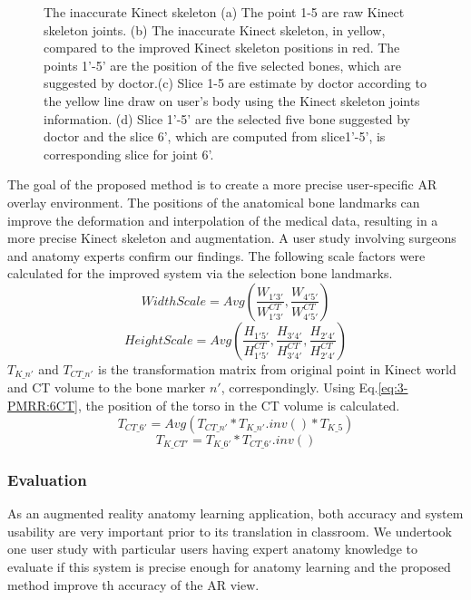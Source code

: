 \begin{figure}
{	}
	\label{fig:3-PRMM:5Joints}
	\caption{The inaccurate Kinect skeleton (a) The point 1-5 are raw Kinect skeleton joints. (b) The inaccurate Kinect skeleton, in yellow, compared to the improved Kinect skeleton positions in red. The points 1'-5' are the position of the five selected bones, which are suggested by doctor.(c) Slice 1-5 are estimate by doctor according to the yellow line draw on user's body using the Kinect skeleton joints information. (d) Slice 1'-5' are the selected five bone suggested by doctor and the slice 6', which are computed from slice1'-5', is corresponding slice for joint 6'.}
\end{figure} 

The goal of the proposed method is to create a more precise user-specific AR overlay environment. The positions of the anatomical bone landmarks can improve the deformation and interpolation of the medical data, resulting in a more precise Kinect skeleton and augmentation. A user study involving surgeons and anatomy experts confirm our findings. The following scale factors were calculated for the improved system via the selection bone landmarks.
\begin{equation}
WidthScale = Avg(\frac{{{W_{1'3'}}}}{{W_{1'3'}^{CT}}},\frac{{{W_{4'5'}}}}{{W_{4'5'}^{CT}}})
\end{equation}
\begin{equation}
HeightScale = Avg(\frac{{{H_{1'5'}}}}{{H_{1'5'}^{CT}}},\frac{{{H_{3'4'}}}}{{H_{3'4'}^{CT}}},\frac{{{H_{2'4'}}}}{{H_{2'4'}^{CT}}})
\end{equation}
$T_{K\_n'}$ and $T_{CT\_n'}$ is the transformation matrix from original point in Kinect world and CT volume to the bone marker $n'$, correspondingly. Using Eq.\ref{eq:3-PMRR:6CT}, the position of the torso in the CT volume is calculated.  
\begin{equation} \label{eq:3-PMRR:6CT}
T_{CT\_6'} = Avg(T_{CT\_n'} * T_{K\_n'}.inv() * T_{K\_5 })
\end{equation}
\begin{equation}
T_{K\_CT'} = T_{K\_6'} * T_{CT\_6'}.inv()
\end{equation}

\subsubsection{Evaluation}
As an augmented reality anatomy learning application, both accuracy and system usability are very important prior to its translation in classroom. We undertook one user study with particular users having expert anatomy knowledge to evaluate if this system is precise enough for anatomy learning and the proposed method improve th accuracy of the AR view.
